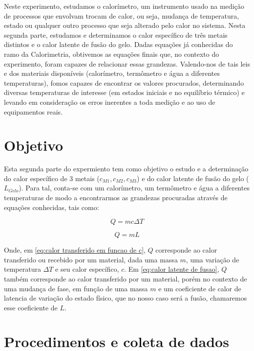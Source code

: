 \documentclass[a4paper]{article}
\begin{document}
		Neste experimento, estudamos o calorímetro, um instrumento usado na	medição de processos que envolvam trocam de calor, ou seja, mudança	de temperatura, estado ou qualquer outro processo que seja alterado pelo calor no sistema.
		Nesta segunda parte, estudamos e determinamos o calor específico de	três metais distintos e o calor latente de fusão do gelo. Dadas equações já conhecidas do ramo da Calorimetria, obtivemos as equações finais que, no contexto do experimento, foram capazes de relacionar essas grandezas. Valendo-nos de tais leis e dos materiais disponíveis (calorímetro, termômetro e água a diferentes temperaturas), fomos capazes de encontrar os valores procurados, determinando diversas temperaturas de interesse (em estados iniciais e no equilíbrio térmico) e levando em consideração os erros inerentes a toda medição e ao uso de equipamentos reais.

	\section{Objetivo}

		Esta segunda parte do expermiento tem como objetivo o estudo e a determinação do calor específico de 3 metais ($c_{M1},c_{M2},c_{M3}$) e do calor latente de fusão do gelo ($L_{Gelo}$). Para tal, conta-se com um calorímetro, um termômetro e água a diferentes temperaturas de modo a encontrarmos as grandezas procuradas através de equações conhecidas,	tais como:

		\begin{equation}
			Q=mc\Delta T
			\label{eq:calor transferido em funcao de c}
		\end{equation}


		\begin{equation}
			Q=mL
			\label{eq:calor latente de fusao}
		\end{equation}


		Onde, em \eqref{eq:calor transferido em funcao de c}, $Q$ corresponde ao calor transferido ou recebido por um material, dada uma massa $m$,	uma variação de temperatura $\Delta T$ e seu calor específico, $c$.	Em \eqref{eq:calor latente de fusao}, $Q$ também corresponde ao calor transferido por um material, porém no contexto de uma mudança de fase, em função de uma massa $m$ e um coeficiente de calor de latencia de variação do estado físico, que no nosso caso será a fusão, chamaremos esse coeficiente de $L$.

	\section{Procedimentos e coleta de dados}
		
\end{document}
